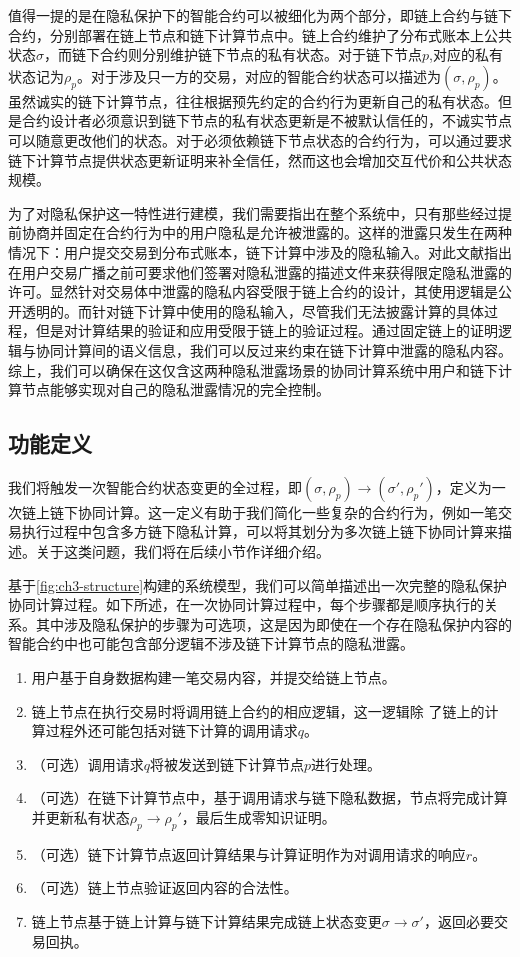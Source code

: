 值得一提的是在隐私保护下的智能合约可以被细化为两个部分，即链上合约与链下合约，分别部署在链上节点和链下计算节点中。链上合约维护了分布式账本上公共状态$\sigma$，而链下合约则分别维护链下节点的私有状态。对于链下节点$\mathit{p}$,对应的私有状态记为$\rho_\mathit{p}$。对于涉及只一方的交易，对应的智能合约状态可以描述为$(\sigma, \rho_\mathit{p})$。虽然诚实的链下计算节点，往往根据预先约定的合约行为更新自己的私有状态。但是合约设计者必须意识到链下节点的私有状态更新是不被默认信任的，不诚实节点可以随意更改他们的状态。对于必须依赖链下节点状态的合约行为，可以通过要求链下计算节点提供状态更新证明来补全信任，然而这也会增加交互代价和公共状态规模\cite{9505181}。

为了对隐私保护这一特性进行建模，我们需要指出在整个系统中，只有那些经过提前协商并固定在合约行为中的用户隐私是允许被泄露的。这样的泄露只发生在两种情况下：用户提交交易到分布式账本，链下计算中涉及的隐私输入。对此文献\cite{9505181}指出在用户交易广播之前可要求他们签署对隐私泄露的描述文件来获得限定隐私泄露的许可。显然针对交易体中泄露的隐私内容受限于链上合约的设计，其使用逻辑是公开透明的。而针对链下计算中使用的隐私输入，尽管我们无法披露计算的具体过程，但是对计算结果的验证和应用受限于链上的验证过程。通过固定链上的证明逻辑与协同计算间的语义信息，我们可以反过来约束在链下计算中泄露的隐私内容。综上，我们可以确保在这仅含这两种隐私泄露场景的协同计算系统中用户和链下计算节点能够实现对自己的隐私泄露情况的完全控制。
\subsection{功能定义}
我们将触发一次智能合约状态变更的全过程，即$(\sigma, \rho_\mathit{p})\rightarrow(\sigma', \rho_\mathit{p}')$，定义为一次链上链下协同计算。这一定义有助于我们简化一些复杂的合约行为，例如一笔交易执行过程中包含多方链下隐私计算，可以将其划分为多次链上链下协同计算来描述。关于这类问题，我们将在后续小节作详细介绍。

基于\autoref{fig:ch3-structure}构建的系统模型，我们可以简单描述出一次完整的隐私保护协同计算过程。如下所述，在一次协同计算过程中，每个步骤都是顺序执行的关系。其中涉及隐私保护的步骤为可选项，这是因为即使在一个存在隐私保护内容的智能合约中也可能包含部分逻辑不涉及链下计算节点的隐私泄露。

\begin{enumerate}
\setlength{\itemsep}{1pt}
\item 用户基于自身数据构建一笔交易内容，并提交给链上节点。
\item 链上节点在执行交易时将调用链上合约的相应逻辑，这一逻辑除 了链上的计算过程外还可能包括对链下计算的调用请求$\mathit{q}$。
\item （可选）调用请求$\mathit{q}$将被发送到链下计算节点$\mathit{p}$进行处理。
\item （可选）在链下计算节点中，基于调用请求与链下隐私数据，节点将完成计算并更新私有状态$\rho_\mathit{p}\rightarrow\rho_\mathit{p}'$，最后生成零知识证明。
\item （可选）链下计算节点返回计算结果与计算证明作为对调用请求的响应$\mathit{r}$。
\item （可选）链上节点验证返回内容的合法性。
\item 链上节点基于链上计算与链下计算结果完成链上状态变更$\sigma\rightarrow\sigma'$，返回必要交易回执。
\end{enumerate}

